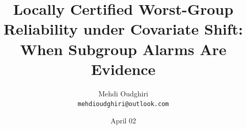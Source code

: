 \documentclass[11pt]{article}
\title{Locally Certified Worst-Group Reliability under Covariate Shift:\\
When Subgroup Alarms Are Evidence}
\author{Mehdi Oudghiri \\
\texttt{mehdioudghiri@outlook.com}}
\date{April 02}
\begin{document}
\maketitle

\begin{abstract}

\end{abstract}










\appendix

\end{document}
